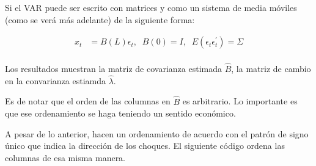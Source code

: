 \documentclass[
]{book}
\newenvironment{Shaded}{\begin{snugshade}}{\end{snugshade}}
\newcommand{\DecValTok}[1]{\textcolor[rgb]{0.00,0.00,0.81}{#1}}
\newcommand{\FunctionTok}[1]{\textcolor[rgb]{0.00,0.00,0.00}{#1}}
\newcommand{\NormalTok}[1]{#1}
\newcommand{\OtherTok}[1]{\textcolor[rgb]{0.56,0.35,0.01}{#1}}
\newcommand{\SpecialCharTok}[1]{\textcolor[rgb]{0.00,0.00,0.00}{#1}}
\begin{document}
Si el VAR puede ser escrito con matrices y como un sistema de media móviles (como se verá más adelante) de la siguiente forma:

\begin{align}
x_{t}&=B(L)\epsilon_{t},\;\;B(0)=I,\;\;E(\epsilon_{t}\epsilon_{t}^{'})=\Sigma 
\end{align}\\
Los resultados muestran la matriz de covarianza estimada \(\hat{B}\), la matriz de cambio en la convarianza estiamda \(\hat{\lambda}\).

Es de notar que el orden de las columnas en \(\hat{B}\) es arbitrario. Lo importante es que ese ordenamiento se haga teniendo un sentido económico.

A pesar de lo anterior, \citet{Herwartz2016} hacen un ordenamiento de acuerdo con el patrón de signo único que indica la dirección de los choques. El siguiente código ordena las columnas de esa misma manera.

\begin{Shaded}
\end{Shaded}
\end{document}
